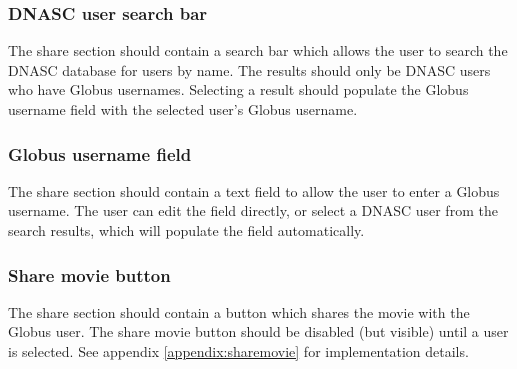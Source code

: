\subsubsection{DNASC user search bar}

The share section should contain a search bar which allows the user to search the DNASC
database for users by name. The results should only be DNASC users who have Globus
usernames. Selecting a result should populate the Globus username field with the selected
user's Globus username. 

\subsubsection{Globus username field}

The share section should contain a text field to allow the user to enter a Globus
username. The user can edit the field directly, or select a DNASC user from the search 
results, which will populate the field automatically.

\subsubsection{Share movie button}

The share section should contain a button which shares the movie with the Globus user.
The share movie button should be disabled (but visible) until a user is selected.
See appendix \ref{appendix:sharemovie} for implementation details.